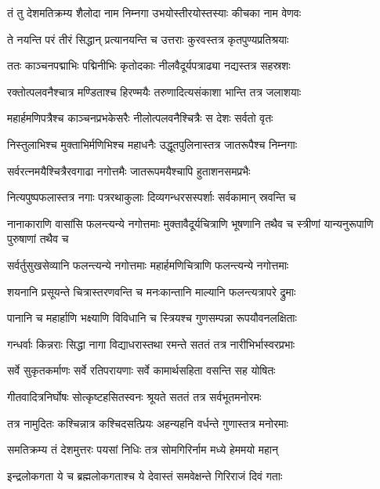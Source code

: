 \twolineshloka
{तं तु देशमतिक्रम्य शैलोदा नाम निम्नगा}
{उभयोस्तीरयोस्तस्याः कीचका नाम वेणवः} %

\twolineshloka
{ते नयन्ति परं तीरं सिद्धान् प्रत्यानयन्ति च}
{उत्तराः कुरवस्तत्र कृतपुण्यप्रतिश्रयाः} %

\twolineshloka
{ततः काञ्चनपद्माभिः पद्मिनीभिः कृतोदकाः}
{नीलवैदूर्यपत्राढ्या नद्यस्तत्र सहस्रशः} %

\twolineshloka
{रक्तोत्पलवनैश्चात्र मण्डिताश्च हिरण्मयैः}
{तरुणादित्यसंकाशा भान्ति तत्र जलाशयाः} %

\twolineshloka
{महार्हमणिपत्रैश्च काञ्चनप्रभकेसरैः}
{नीलोत्पलवनैश्चित्रैः स देशः सर्वतो वृतः} %

\twolineshloka
{निस्तुलाभिश्च मुक्ताभिर्मणिभिश्च महाधनैः}
{उद्धूतपुलिनास्तत्र जातरूपैश्च निम्नगाः} %

\twolineshloka
{सर्वरत्नमयैश्चित्रैरवगाढा नगोत्तमैः}
{जातरूपमयैश्चापि हुताशनसमप्रभैः} %

\twolineshloka
{नित्यपुष्पफलास्तत्र नगाः पत्ररथाकुलाः}
{दिव्यगन्धरसस्पर्शाः सर्वकामान् स्रवन्ति च} %

\threelineshloka
{नानाकाराणि वासांसि फलन्त्यन्ये नगोत्तमाः}
{मुक्तावैदूर्यचित्राणि भूषणानि तथैव च}
{स्त्रीणां यान्यनुरूपाणि पुरुषाणां तथैव च} %

\twolineshloka
{सर्वर्तुसुखसेव्यानि फलन्त्यन्ये नगोत्तमाः}
{महार्हमणिचित्राणि फलन्त्यन्ये नगोत्तमाः} %

\twolineshloka
{शयनानि प्रसूयन्ते चित्रास्तरणवन्ति च}
{मनःकान्तानि माल्यानि फलन्त्यत्रापरे द्रुमाः} %

\twolineshloka
{पानानि च महार्हाणि भक्ष्याणि विविधानि च}
{स्त्रियश्च गुणसम्पन्ना रूपयौवनलक्षिताः} %

\twolineshloka
{गन्धर्वाः किन्नराः सिद्धा नागा विद्याधरास्तथा}
{रमन्ते सततं तत्र नारीभिर्भास्वरप्रभाः} %

\twolineshloka
{सर्वे सुकृतकर्माणः सर्वे रतिपरायणाः}
{सर्वे कामार्थसहिता वसन्ति सह योषितः} %

\twolineshloka
{गीतवादित्रनिर्घोषः सोत्कृष्टहसितस्वनः}
{श्रूयते सततं तत्र सर्वभूतमनोरमः} %

\twolineshloka
{तत्र नामुदितः कश्चिन्नात्र कश्चिदसत्प्रियः}
{अहन्यहनि वर्धन्ते गुणास्तत्र मनोरमाः} %

\twolineshloka
{समतिक्रम्य तं देशमुत्तरः पयसां निधिः}
{तत्र सोमगिरिर्नाम मध्ये हेममयो महान्} %

\twolineshloka
{इन्द्रलोकगता ये च ब्रह्मलोकगताश्च ये}
{देवास्तं समवेक्षन्ते गिरिराजं दिवं गताः} %

